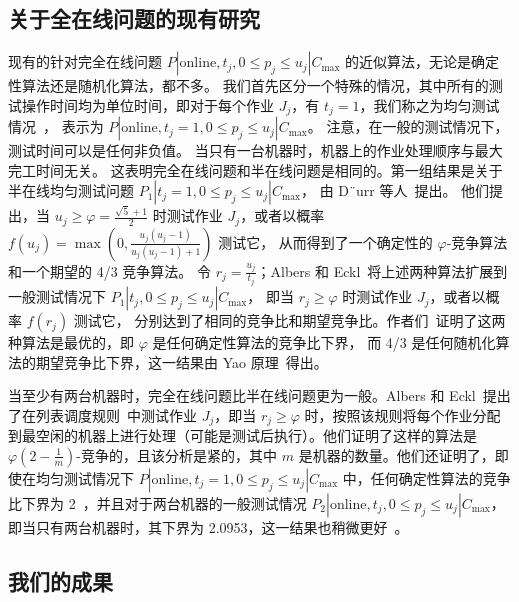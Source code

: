 \subsection{关于全在线问题的现有研究}

现有的针对完全在线问题 \( P | \text{online}, t_j, 0 \leq p_j \leq u_j | C_{\text{max}} \) 的近似算法，无论是确定性算法还是随机化算法，都不多。
我们首先区分一个特殊的情况，其中所有的测试操作时间均为单位时间，即对于每个作业 \( J_j \)，有 \( t_j = 1 \)，我们称之为均匀测试情况~\cite{durr2018scheduling,durr2020adversarial,albers2021scheduling}，
表示为 \( P | \text{online}, t_j = 1, 0 \leq p_j \leq u_j | C_{\text{max}} \)。
注意，在一般的测试情况下，测试时间可以是任何非负值。
当只有一台机器时，机器上的作业处理顺序与最大完工时间无关。
这表明完全在线问题和半在线问题是相同的。第一组结果是关于半在线均匀测试问题 \( P_1 | t_j = 1, 0 \leq p_j \leq u_j | C_{\text{max}} \)，
由 D¨urr 等人~\cite{durr2018scheduling,durr2020adversarial}提出。
他们提出，当 \( u_j \geq \varphi = \frac{\sqrt{5} + 1}{2} \) 时测试作业 \( J_j \)，或者以概率 \( f(u_j) = \max \left( 0, \frac{u_j(u_j - 1)}{u_j(u_j - 1) + 1} \right) \) 测试它，
从而得到了一个确定性的 \( \varphi \)-竞争算法和一个期望的 4/3 竞争算法。
令 \( r_j = \frac{u_j}{t_j} \)；Albers 和 Eckl~\cite{albers2021explorable}将上述两种算法扩展到一般测试情况下 \( P_1 | t_j, 0 \leq p_j \leq u_j | C_{\text{max}} \)，
即当 \( r_j \geq \varphi \) 时测试作业 \( J_j \)，或者以概率 \( f(r_j) \) 测试它，
分别达到了相同的竞争比和期望竞争比。作者们~\cite{durr2018scheduling,durr2020adversarial,albers2021explorable}证明了这两种算法是最优的，即 \( \varphi \) 是任何确定性算法的竞争比下界，
而 4/3 是任何随机化算法的期望竞争比下界，这一结果由 Yao 原理~\cite{yao1977probabilistic}得出。 

当至少有两台机器时，完全在线问题比半在线问题更为一般。Albers 和 Eckl~\cite{albers2021scheduling}提出了在列表调度规则~\cite{graham1966bounds}中测试作业 \( J_j \)，即当 \( r_j \geq \varphi \) 时，按照该规则将每个作业分配到最空闲的机器上进行处理（可能是测试后执行）。他们证明了这样的算法是 \( \varphi(2 - \frac{1}{m}) \)-竞争的，且该分析是紧的，其中 \( m \) 是机器的数量。他们还证明了，即使在均匀测试情况下 \( P | \text{online}, t_j = 1, 0 \leq p_j \leq u_j | C_{\text{max}} \) 中，任何确定性算法的竞争比下界为 2~\cite{albers2021scheduling}，并且对于两台机器的一般测试情况 \( P_2 | \text{online}, t_j, 0 \leq p_j \leq u_j | C_{\text{max}} \)，即当只有两台机器时，其下界为 2.0953，这一结果也稍微更好~\cite{albers2021scheduling}。

\subsection{我们的成果}

